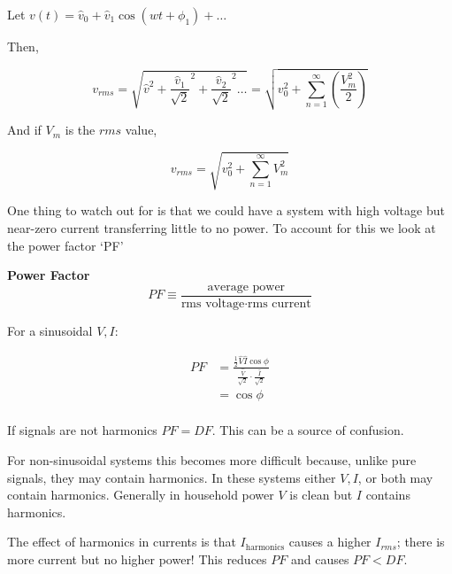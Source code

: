 \documentclass[10pt]{article}
\begin{document}
\begin{definition}
	Let $ v(t) = \hat{v}_0 + \hat{v}_1 \cos(wt+\phi_1) + \ldots $ 

	Then,


	\begin{equation}
		v_{rms} = \sqrt{\hat{v}^2 + \frac{\hat{v}_1}{\sqrt{2} }^2 + \frac{\hat{v}_2}{\sqrt{2} }^2 \ldots }   = \sqrt{v_0^2 + \sum^\infty_{n=1} (\frac{V_m^2}{2})} 
	\end{equation}

	And if $ V_m $ is the $ rms $ value,

	\begin{equation}
		v_{rms} = \sqrt{v_0^2 + \sum^\infty_{n=1} V_m^2} 
	\end{equation}
	

\end{definition}

One thing to watch out for is that we could have a system with high voltage but near-zero current transferring little to no power. 
To account for this we look at the power factor `PF'

\begin{definition}
	\textbf{Power Factor} 
	\begin{equation}
		PF \equiv \frac{\text{average power}}{\text{rms voltage} \cdot  \text{rms current}}
	\end{equation}
\end{definition}

For a sinusoidal $ V, I $:


\begin{equation}
	\begin{split}
		PF &= \frac{\frac{1}{2} \hat{V} \hat{I} \cos \phi}{  \frac{\hat{V}}{\sqrt{2} } \cdot  \frac{\hat{I}}{\sqrt{2} }  }  \\
		 &=  \cos\phi\\
	\end{split}
\end{equation}


If signals are not harmonics $ PF = DF $. This can be a source of confusion. 


For non-sinusoidal systems this becomes more difficult because, unlike pure signals, they may contain harmonics.
In these systems either $ V, I $, or both may contain harmonics. 
Generally in household power $ V $ is clean but $ I $ contains harmonics.


The effect of harmonics in currents is that $ I_{\text{harmonics}} $ causes a higher $ I_{rms} $; there is more current but no higher power!
This reduces $ PF $ and causes $ PF < DF $.
\end{document}
